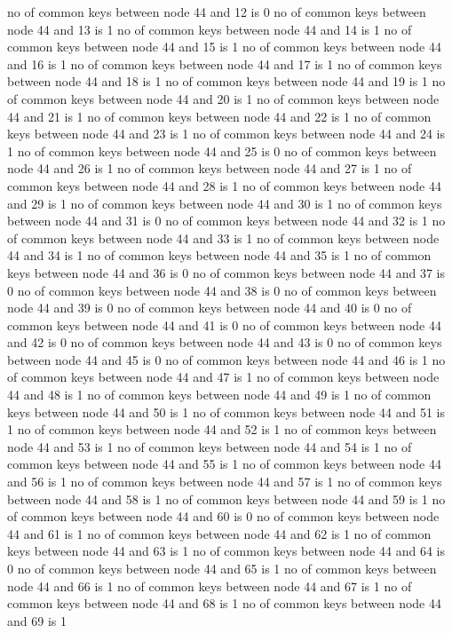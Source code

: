 no of common keys between node 44 and 12 is 0
no of common keys between node 44 and 13 is 1
no of common keys between node 44 and 14 is 1
no of common keys between node 44 and 15 is 1
no of common keys between node 44 and 16 is 1
no of common keys between node 44 and 17 is 1
no of common keys between node 44 and 18 is 1
no of common keys between node 44 and 19 is 1
no of common keys between node 44 and 20 is 1
no of common keys between node 44 and 21 is 1
no of common keys between node 44 and 22 is 1
no of common keys between node 44 and 23 is 1
no of common keys between node 44 and 24 is 1
no of common keys between node 44 and 25 is 0
no of common keys between node 44 and 26 is 1
no of common keys between node 44 and 27 is 1
no of common keys between node 44 and 28 is 1
no of common keys between node 44 and 29 is 1
no of common keys between node 44 and 30 is 1
no of common keys between node 44 and 31 is 0
no of common keys between node 44 and 32 is 1
no of common keys between node 44 and 33 is 1
no of common keys between node 44 and 34 is 1
no of common keys between node 44 and 35 is 1
no of common keys between node 44 and 36 is 0
no of common keys between node 44 and 37 is 0
no of common keys between node 44 and 38 is 0
no of common keys between node 44 and 39 is 0
no of common keys between node 44 and 40 is 0
no of common keys between node 44 and 41 is 0
no of common keys between node 44 and 42 is 0
no of common keys between node 44 and 43 is 0
no of common keys between node 44 and 45 is 0
no of common keys between node 44 and 46 is 1
no of common keys between node 44 and 47 is 1
no of common keys between node 44 and 48 is 1
no of common keys between node 44 and 49 is 1
no of common keys between node 44 and 50 is 1
no of common keys between node 44 and 51 is 1
no of common keys between node 44 and 52 is 1
no of common keys between node 44 and 53 is 1
no of common keys between node 44 and 54 is 1
no of common keys between node 44 and 55 is 1
no of common keys between node 44 and 56 is 1
no of common keys between node 44 and 57 is 1
no of common keys between node 44 and 58 is 1
no of common keys between node 44 and 59 is 1
no of common keys between node 44 and 60 is 0
no of common keys between node 44 and 61 is 1
no of common keys between node 44 and 62 is 1
no of common keys between node 44 and 63 is 1
no of common keys between node 44 and 64 is 0
no of common keys between node 44 and 65 is 1
no of common keys between node 44 and 66 is 1
no of common keys between node 44 and 67 is 1
no of common keys between node 44 and 68 is 1
no of common keys between node 44 and 69 is 1
